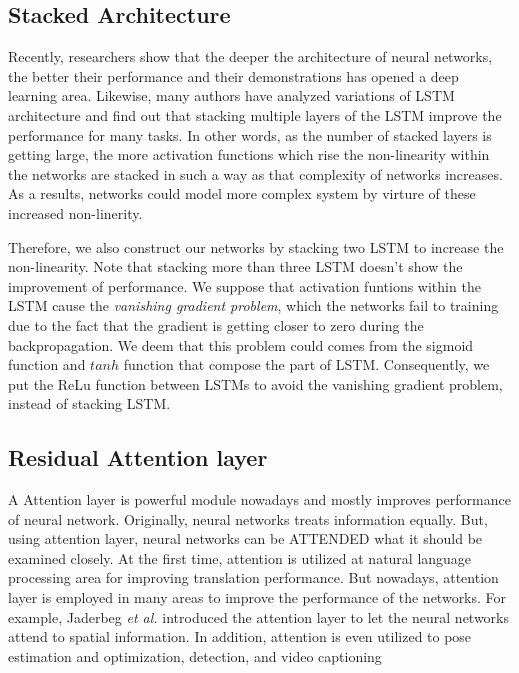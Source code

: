 \documentclass{ieeeaccess}
\begin{document}
\subsection{Stacked Architecture}

Recently, researchers show that the deeper the architecture of neural networks, the better their performance\cite{simonyan2014very, he2016deep} and their demonstrations has opened a deep learning area. Likewise, many authors have analyzed variations of LSTM architecture and find out that stacking multiple layers of the LSTM improve the performance for many tasks\cite{graves2013hybrid, graves2013speech,ullah2018action}. In other words, as the number of stacked layers is getting large, the more activation functions which rise the non-linearity within the networks are stacked  in such a way as that complexity of networks increases. As a results, networks could model more complex system by virture of these increased non-linerity.

Therefore, we also construct our networks by stacking two LSTM to increase the non-linearity. Note that stacking more than three LSTM doesn't show the improvement of performance. We suppose that activation funtions within the LSTM cause the \textit{vanishing gradient problem}\cite{pascanu2013difficulty}, which the networks fail to training due to the fact that the gradient is getting closer to zero during the backpropagation. We deem that this problem could comes from the sigmoid function and $tanh$ function that compose the part of LSTM. Consequently, we put the ReLu function between LSTMs to avoid the vanishing gradient problem\cite{nair2010rectified}, instead of stacking LSTM.    

\subsection{Residual Attention layer}

A Attention layer is powerful module nowadays and mostly improves performance of neural network. Originally, neural networks treats information equally. But, using attention layer, neural networks can be ATTENDED what it should be examined closely. At the first time, attention is utilized at natural language processing area for improving translation performance\cite{luong2015effective}. But nowadays, attention layer is employed in many areas to improve the performance of the networks. For example, Jaderbeg \textit{et al.}\cite{jaderberg2015spatial} introduced the attention layer to let the neural networks attend to spatial information. In addition, attention is even utilized to pose estimation and optimization\cite{parisotto2018global}, detection\cite{zhu2018towards}, and video captioning\cite{xu2017learning} 
\end{document}
